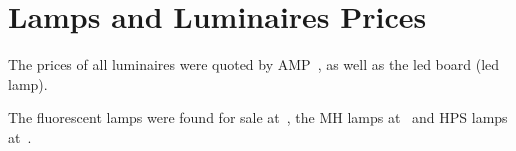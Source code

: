 \chapter{Lamps and Luminaires Prices}

The prices of all luminaires were quoted by AMP~\cite{www:luminaires_saler}, as well as the led board (led lamp).

The fluorescent lamps were found for sale at~\cite{www:fluo_lamp_saler}, the MH lamps at~\cite{www:mh_lamp_saler} and HPS lamps at~\cite{www:hps_lamp_saler}.

